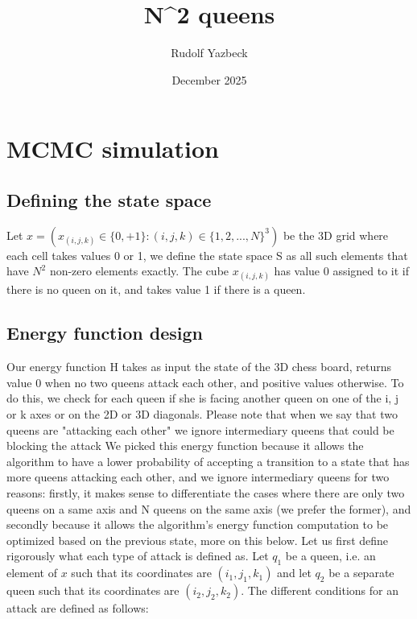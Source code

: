 \documentclass{article}
\title{N^2 queens}
\author{Rudolf Yazbeck}
\date{December 2025}
\begin{document}
\maketitle

\section{MCMC simulation}

\subsection{Defining the state space}
Let $x =(x_{(i,j,k)} \in \{0,+1\}: (i,j,k) \in \{ 1,2,...,N\}^3)$ be the 3D grid where each cell takes values 0 or 1, we define the state space S as all such elements that have $N^2$ non-zero elements exactly. 
\newline
The cube $x_{(i,j,k)}$ has value 0 assigned to it if there is no queen on it, and takes value 1 if there is a queen.

\subsection{Energy function design}
Our energy function H takes as input the state of the 3D chess board, returns value 0 when no two queens attack each other, and positive values otherwise. To do this, we check for each queen if she is facing another queen on one of the i, j or k axes or on the 2D or 3D diagonals. Please note that when we say that two queens are "attacking each other" we ignore intermediary queens that could be blocking the attack\newline 
We picked this energy function because it allows the algorithm to have a lower probability of accepting a transition to a state that has more queens attacking each other, and we ignore intermediary queens for two reasons: firstly, it makes sense to differentiate the cases where there are only two queens on a same axis and N queens on the same axis (we prefer the former), and secondly because it allows the algorithm's energy function computation to be optimized based on the previous state, more on this below.
\newline 
\newline 
Let us first define rigorously what each type of attack is defined as. Let $q_1$ be a queen, i.e. an element of $x$ such that its coordinates are $(i_1, j_1, k_1)$ and let $q_2$ be a separate queen such that its coordinates are $(i_2, j_2, k_2)$. The different conditions for an attack are defined as follows: \newline
\end{document}
